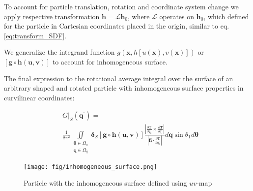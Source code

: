 \documentclass[10pt, a4paper]{article}
\begin{document}
\begin{multicols}{2}
To account for particle translation, rotation and coordinate system change we apply respective transformation $\bm{h} = \mathcal{L}\bm{h}_0$, where $\mathcal{L}$ operates on $\bm{h}_0$, which defined for the particle in Cartesian coordinates placed in the origin, similar to eq.\ref{eq:transform_SDF}.

We generalize the integrand function $g(\bm{x}, h[u(\bm{x}), v(\bm{x})])$ or $[\bm{g} \circ \bm{h}(\bm{u}, \bm{v})]$  to account for inhomogeneous surface.

The final expression to the rotational average integral over the surface of an arbitrary shaped and rotated particle with inhomogeneous surface properties in curvilinear coordinates:

\begin{equation}\label{eq:general_int_S_inhomogenous}
    \begin{aligned}
    &\left.G\right|_S (\bm{q}^{\prime}) = \\ & \frac{1}{8\pi^2} \iint 
    \limits_{\substack{
        \bm{\theta} \in \Omega_{\theta} \\
        \bm{q} \in \Omega_{q}}}
    \bm{\delta}_S \left[\bm{g} \circ \bm{h}(\bm{u}, \bm{v})\right]
    \frac{\left|\frac{\partial \bm{T}}{\partial q_0} \times \frac{\partial \bm{T}}{\partial q_1} \right|}{\left|\hat{\bm{n}} \cdot \frac{\partial\bm{T}}{\partial q_2}\right|}
    d\bm{q}  \sin \theta_1 d \bm{\theta}
    \end{aligned}
\end{equation}

\begin{figure}[H]
    \centering
    \texttt{[image: fig/inhomogeneous\_surface.png]}
    \caption{
        Particle with the inhomogeneous surface defined using $uv$-map
    }
    \label{fig:inhomogeneous_surface}
\end{figure}
    
\end{multicols}


\end{document}
